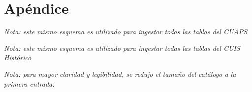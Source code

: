 \chapter{Apéndice}
\label{chap:apendice}

\scriptsize{\textit{Nota: este mismo esquema es utilizado para ingestar todas las tablas del CUAPS}}
\pagebreak

\pagebreak

\scriptsize{\textit{Nota: este mismo esquema es utilizado para ingestar todas las tablas del CUIS Histórico}}
\pagebreak

\pagebreak

\scriptsize{\textit{Nota: para mayor claridad y legibilidad, se redujo el tamaño del catálogo a la primera entrada.}}
